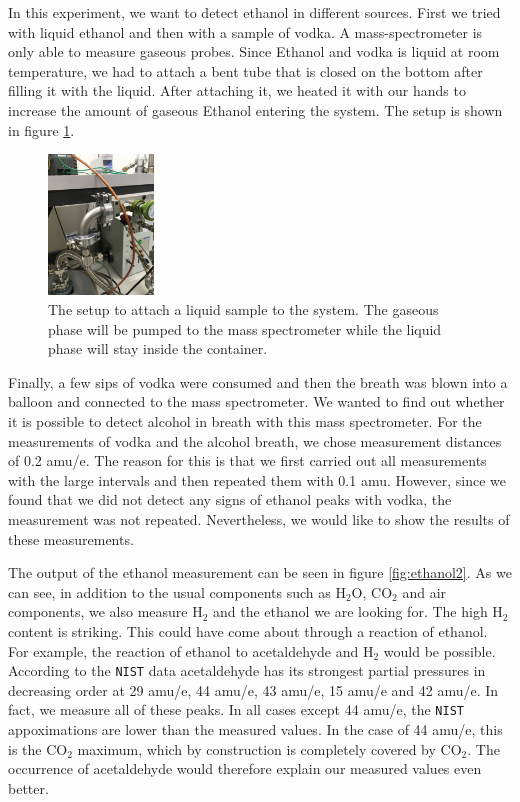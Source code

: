     In this experiment, we want to detect ethanol in different sources. First we tried with liquid ethanol and then with a sample of vodka. 
    A mass-spectrometer is only able to measure gaseous probes. Since Ethanol and vodka is liquid at room temperature, we had to attach a bent tube that is closed on the bottom after filling it with the liquid. After attaching it, we heated it with our hands to increase the amount of gaseous Ethanol entering the system. The setup is shown in figure \ref{fig:ethanol}.
    \begin{figure}[h!]
    \centering
    \includegraphics[angle=-90, origin=c,width=0.25\textwidth]{Report/pictures/liquids.JPG}
    \caption{The setup to attach a liquid sample to the system. The gaseous phase will be pumped to the mass spectrometer while the liquid phase will stay inside the container.}
    \label{fig:ethanol}
    \end{figure}
    Finally, a few sips of vodka were consumed and then the breath was blown into a balloon and connected to the mass spectrometer. We wanted to find out whether it is possible to detect alcohol in breath with this mass spectrometer. For the measurements of vodka and the alcohol breath, we chose measurement distances of 0.2 amu/e. The reason for this is that we first carried out all measurements with the large intervals and then repeated them with 0.1 amu. However, since we found that we did not detect any signs of ethanol peaks with vodka, the measurement was not repeated. Nevertheless, we would like to show the results of these measurements.
    
    The output of the ethanol measurement can be seen in figure \ref{fig:ethanol2}. As we can see, in addition to the usual components such as H$_2$O, CO$_2$ and air components, we also measure H$_2$ and the ethanol we are looking for. The high H$_2$ content is striking. This could have come about through a reaction of ethanol. For example, the reaction of ethanol to acetaldehyde and H$_2$ would be possible. According to the \texttt{NIST} data acetaldehyde has its strongest partial pressures in decreasing order at 29 amu/e, 44 amu/e, 43 amu/e, 15 amu/e and 42 amu/e. In fact, we measure all of these peaks. In all cases except 44 amu/e, the \texttt{NIST} appoximations are lower than the measured values. In the case of 44 amu/e, this is the CO$_2$ maximum, which by construction is completely covered by CO$_2$. The occurrence of acetaldehyde would therefore explain our measured values even better. 
    
